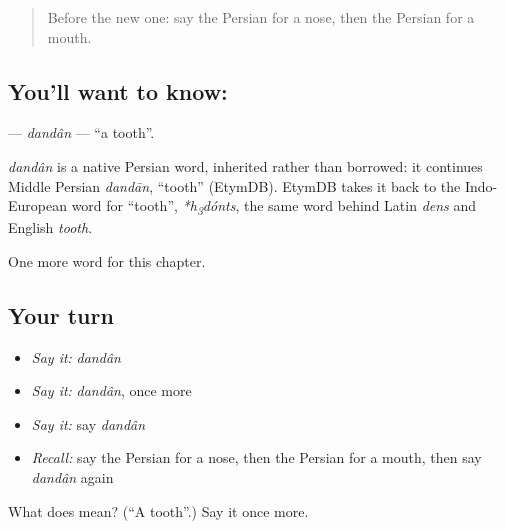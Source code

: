 \label{lesson:FA-C27-dandan}



\begin{quote}
Before the new one: say the Persian for a nose, then the Persian for a mouth.
\end{quote}

\subsection*{You'll want to know: }
\textbf{} — \emph{dandân} — \textquotedblleft{}a tooth\textquotedblright{}.

\begin{cousinweb}
\emph{dandân} is a native Persian word, inherited rather than borrowed: it continues Middle Persian \emph{dandān}, \textquotedblleft{}tooth\textquotedblright{} (EtymDB). EtymDB takes it back to the Indo-European word for \textquotedblleft{}tooth\textquotedblright{}, \emph{*h\textsubscript{3}dónts}, the same word behind Latin \emph{dens} and English \emph{tooth}.
\end{cousinweb}

\begin{grammarlens}[title={What you've built}]
One more word for this chapter.
\end{grammarlens}

\subsection*{Your turn}
\begin{itemize}
\raggedright
  \item \emph{Say it:} \emph{dandân}
  \item \emph{Say it:} \emph{dandân}, once more
  \item \emph{Say it:} say \emph{dandân}
  \item \emph{Recall:} say the Persian for a nose, then the Persian for a mouth, then say \emph{dandân} again
\end{itemize}

\begin{tcolorbox}[breakable,colback=teal!4,colframe=teal!35!black,title={Before you move on}]
What does  mean? (\textquotedblleft{}A tooth\textquotedblright{}.) Say it once more.
\end{tcolorbox}

